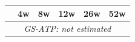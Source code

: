 \begin{tabular}{l*{5}{c}}
\toprule
 & 4w & 8w & 12w & 26w & 52w \\
\midrule
\multicolumn{6}{c}{\textit{GS-ATP: not estimated}} \\
\bottomrule
\end{tabular}
